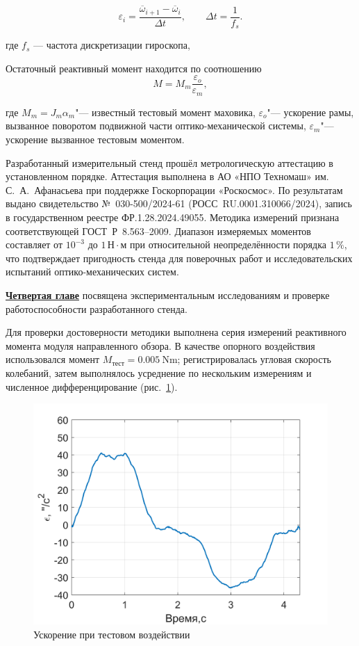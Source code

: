 \begin{equation}
	\label{eq:mean_acc}
	\varepsilon_{i}
	= \frac{\overline{\omega}_{i+1}-\overline{\omega}_{i}}{\Delta t},
	\qquad
	\Delta t = \frac{1}{f_s}.
\end{equation}

где $f_s$ --- частота дискретизации гироскопа,

Остаточный реактивный момент находится по соотношению
\begin{equation}
	M = M_m\frac{\varepsilon_o}{\varepsilon_m},
\end{equation}

где \(M_m = J_m\alpha_m\)"--- известный тестовый момент маховика, \(\varepsilon_o\)"--- ускорение рамы, вызванное поворотом подвижной части оптико-механической системы, \(\varepsilon_m\)"--- ускорение вызванное тестовым моментом.

Разработанный измерительный стенд прошёл метрологическую аттестацию
в установленном порядке. Аттестация выполнена в АО «НПО Техномаш»
им. С.~А.~Афанасьева при поддержке Госкорпорации «Роскосмос».
По результатам выдано свидетельство №~030-500/2024-61
(РОСС~RU.0001.310066/2024), запись в государственном реестре
ФР.1.28.2024.49055. Методика измерений признана соответствующей
ГОСТ~Р~8.563–2009. Диапазон измеряемых моментов составляет
от $10^{-3}$ до $1\,\text{Н}\cdot\text{м}$ при относительной
неопределённости порядка $1\,\%$, что подтверждает пригодность стенда
для поверочных работ и исследовательских испытаний оптико-механических систем.

\underline{\textbf{Четвертая главе}} посвящена экспериментальным исследованиям и проверке работоспособности разработанного стенда.

Для проверки достоверности методики выполнена серия измерений реактивного момента модуля направленного обзора.
В качестве опорного воздействия использовался момент $M_{\text{тест}}=\SI{0.005}{\newton\meter}$;
регистрировалась угловая скорость колебаний, затем выполнялось усреднение по нескольким измерениям и численное дифференцирование (рис.~\cref{fig:test-gyro-acc}).

\begin{figure}[h!]
	\centering
	\includegraphics[scale=0.3]{matlab/img/test-gyro-acc}
	\caption{Ускорение при тестовом воздействии}
	\label{fig:test-gyro-acc}
\end{figure}

